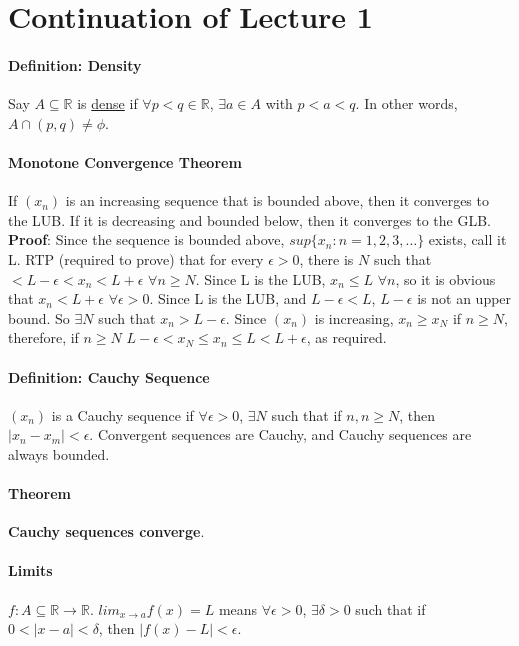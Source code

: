 \documentclass[10pt,letter]{article}
\begin{document}
\section*{Continuation of Lecture 1}

\paragraph*{Definition: Density}
Say $A\subseteq\mathbb{R}$ is \underline{dense} if $\forall p<q\in\mathbb{R}$, $\exists a\in A$ with $p<a<q$. In other words, $A\cap(p,q)\neq\phi$. 

\paragraph*{Monotone Convergence Theorem}
If $(x_n)$ is an increasing sequence that is bounded above, then it converges to the LUB. If it is decreasing and bounded below, then it converges to the GLB. \\ 
\textbf{Proof}: Since the sequence is bounded above, $sup\{x_n:n=1,2,3,\ldots\}$ exists, call it L. RTP (required to prove) that for every $\epsilon>0$, there is $N$ such that $<L-\epsilon<x_n<L+\epsilon$ $\forall n\geq N$. Since L is the LUB, $x_n\leq L$ $\forall n$, so it is obvious that $x_n<L+\epsilon$ $\forall\epsilon>0$. Since L is the LUB, and $L-\epsilon<L$, $L-\epsilon$ is not an upper bound. So $\exists N$ such that $x_n>L-\epsilon$. Since $(x_n)$ is increasing, $x_n\geq x_N$ if $n\geq N$, therefore, if $n\geq N$ $L-\epsilon<x_N\leq x_n\leq L<L+\epsilon$, as required. 

\paragraph*{Definition: Cauchy Sequence}
$(x_n)$ is a Cauchy sequence if $\forall\epsilon>0$, $\exists N$ such that if $n,n\geq N$, then $|x_n-x_m|<\epsilon$. Convergent sequences are Cauchy, and Cauchy sequences are always bounded. 
\paragraph*{Theorem}
\textbf{Cauchy sequences converge}. 

\paragraph*{Limits}
$f:A\subseteq\mathbb{R}\rightarrow\mathbb{R}$. $lim_{x\rightarrow a}f(x)=L$ means $\forall\epsilon>0$, $\exists\delta>0$ such that if $0<|x-a|<\delta$, then $|f(x)-L|<\epsilon$. 
\end{document}
